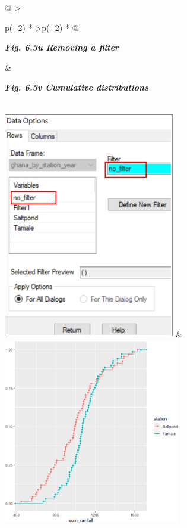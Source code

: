 \documentclass[
  letterpaper,
  DIV=11,
  numbers=noendperiod]{scrreprt}
\begin{document}
\begin{longtable}[]{@{}
  >{\raggedright\arraybackslash}p{(\columnwidth - 2\tabcolsep) * }
  >{\raggedleft\arraybackslash}p{(\columnwidth - 2\tabcolsep) * }@{}}
\toprule\noalign{}
\begin{minipage}[b]{\linewidth}\raggedright
\textbf{\emph{Fig. 6.3u Removing a filter}}
\end{minipage} & \begin{minipage}[b]{\linewidth}\raggedleft
\textbf{\emph{Fig. 6.3v Cumulative distributions}}
\end{minipage} \\
\midrule\noalign{}
\endhead
\bottomrule\noalign{}
\endlastfoot
\includegraphics[width=2.95154in,height=3.90298in]{figures/Fig6.3u.png}
&
\includegraphics[width=3.04261in,height=3.20707in]{figures/Fig6.3v.png} \\
\end{longtable}
\end{document}
